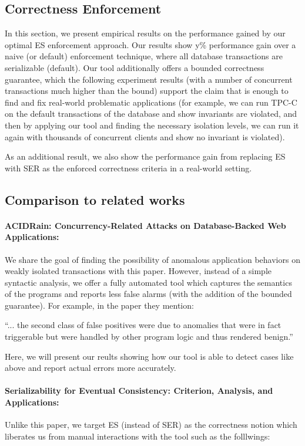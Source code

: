 \documentclass[12pt,letter]{article}
\begin{document}
\subsection{Correctness Enforcement}
In this section, we present empirical results on the performance gained by
our optimal ES enforcement approach. Our results show y\% performance gain
over a naive (or default) enforcement technique, where all database
transactions are
serializable (default). Our tool additionally offers a bounded correctness
guarantee, which the following experiment results (with a number of
concurrent
transactions much higher than the bound) support the claim that is
enough to find and fix real-world problematic applications
(for example, we can run TPC-C on the default transactions of the database
and show
invariants are violated, and then by applying our tool and finding the
necessary isolation levels, we can run it again with thousands of
concurrent clients and show no invariant is violated).

As an additional result, we also show the performance gain from replacing
ES with SER as the enforced correctness criteria in a real-world setting.
\subsection{Comparison to related works}
\paragraph{ACIDRain: Concurrency-Related Attacks on Database-Backed Web
Applications\cite{Bailis:Acid}:}
We share the goal of finding the possibility of anomalous application
behaviors
on weakly isolated transactions with this paper. However, instead of a
simple syntactic
analysis, we offer a fully automated tool which captures the semantics of
the
programs and reports less false alarms (with the addition of the bounded
guarantee). For example, in the paper they mention:
\begin{displayquote}
``... the second class of false positives were due to anomalies that were in fact
triggerable but were handled by other program logic and thus rendered
benign.''
\end{displayquote}
Here, we will present our reults showing how our tool is able to detect
cases like above and report actual errors more accurately. 


\paragraph{Serializability for Eventual Consistency: Criterion, Analysis, and
Applications\cite{Vechev:Ser}:} Unlike this paper, we target ES (instead of
SER) as the
correctness notion which liberates us from manual interactions with the
tool such as the folllwings: 
\end{document}

